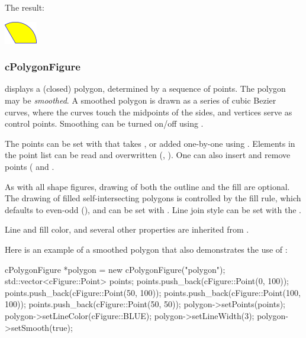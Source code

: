 
The result:

\begin{center}
\includegraphics[scale=4.0]{figures/figure-pieslice}
\end{center}


\subsubsection{cPolygonFigure}

 displays a (closed) polygon, determined by a sequence of points.
The polygon may be \textit{smoothed}. A smoothed polygon is drawn as a series
of cubic Bezier curves, where the curves touch the midpoints of the sides,
and vertices serve as control points. Smoothing can be turned on/off
using .

The points can be set with  that takes ,
or added one-by-one using . Elements in the point list can be
read and overwritten (, ). One can also
insert and remove points ( and .

As with all shape figures, drawing of both the outline and the fill
are optional. The drawing of filled self-intersecting polygons is controlled
by the fill rule, which defaults to even-odd (), and
can be set with . Line join style can be set with
the .

Line and fill color, and several other properties are inherited from
.

Here is an example of a smoothed polygon that also demonstrates
the use of :

\begin{cpp}
cPolygonFigure *polygon = new cPolygonFigure("polygon");
std::vector<cFigure::Point> points;
points.push_back(cFigure::Point(0, 100));
points.push_back(cFigure::Point(50, 100));
points.push_back(cFigure::Point(100, 100));
points.push_back(cFigure::Point(50, 50));
polygon->setPoints(points);
polygon->setLineColor(cFigure::BLUE);
polygon->setLineWidth(3);
polygon->setSmooth(true);
\end{cpp}

